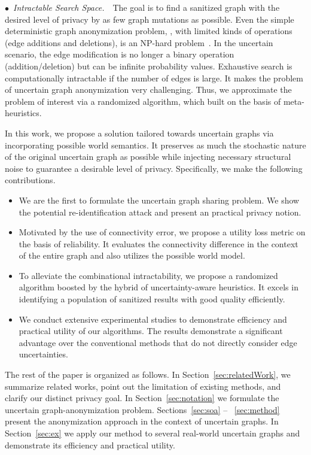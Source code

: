 $\bullet$~\textup{\emph{Intractable Search Space.}}~~The goal is to find a sanitized graph with the desired level of privacy by as few graph mutations as possible. 
Even the simple deterministic graph anonymization problem, {\ie}, with limited kinds of operations (edge additions and deletions), is an NP-hard problem~\cite{Hartung_Theory_2015}. 
In the uncertain scenario, the edge modification is no longer a binary operation (addition/deletion) but can be infinite probability values. Exhaustive search is computationally intractable if the number of edges is large. 
It makes the problem of uncertain graph anonymization very challenging. 
Thus, we approximate the problem of interest via a randomized algorithm, which built on the basis of meta-heuristics. 

In this work, we propose a solution tailored towards uncertain graphs via incorporating possible world semantics.  
It preserves as much the stochastic nature of the original uncertain graph as possible while injecting necessary structural noise to guarantee a desirable level of privacy.
Specifically, we make the following contributions.
\begin{itemize}
\item We are the first to formulate the uncertain graph sharing problem. 
 We show the potential re-identification attack and present an practical privacy notion. 
\item Motivated by the use of connectivity error, we propose a utility loss metric on the basis of reliability. It evaluates the connectivity difference in the context of the entire graph and also utilizes the possible world model. 
\item To alleviate the combinational intractability, we propose a randomized algorithm boosted by the hybrid of uncertainty-aware heuristics. It excels in identifying a population of sanitized results with good quality efficiently.
\item We conduct extensive experimental studies to demonstrate efficiency and practical utility of our algorithms. The results demonstrate a significant advantage over the conventional methods that do not directly consider edge uncertainties.
\end{itemize}

The rest of the paper is organized as follows. In Section~\ref{sec:relatedWork}, we summarize related works, point out the limitation of existing methods, and clarify our distinct privacy goal. In Section~\ref{sec:notation} we formulate the uncertain graph-anonymization problem. Sections~\ref{sec:soa} – ~\ref{sec:method} present the anonymization approach in the context of uncertain graphs.  In Section~\ref{sec:ex} we apply our method to several real-world uncertain graphs and demonstrate its efficiency and practical utility. 
